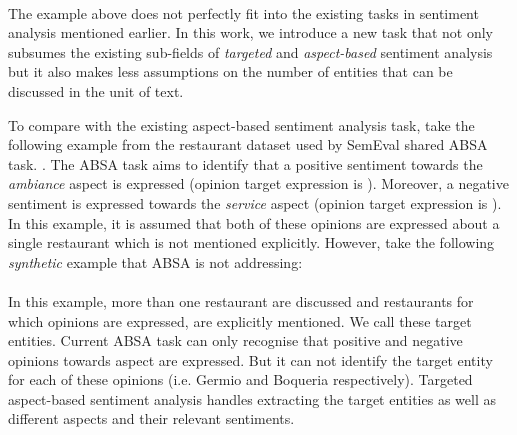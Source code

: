 \documentclass[11pt]{article}
\begin{document}
    \\
    
    The example above does not perfectly fit into the existing tasks in sentiment analysis mentioned earlier. In this work, we introduce a new task that not only subsumes the existing sub-fields of \emph{targeted} and \emph{aspect-based} sentiment analysis but it also makes less assumptions on the number of entities that can be discussed in the unit of text. 
    
    To compare with the existing aspect-based sentiment analysis task, take the following example from the restaurant dataset used by SemEval shared ABSA~\cite{SemEval_2016_task5} task. . The ABSA task aims to identify that a positive sentiment towards the \textit{ambiance} aspect is expressed (opinion target expression is ). Moreover, a negative sentiment is expressed towards the \textit{service} aspect (opinion target expression is ). In this example, it is assumed that both of these opinions are expressed about a single restaurant which is not mentioned explicitly. However, take the following \emph{synthetic} example that ABSA is not addressing: \\
    
     \\
    
    In this example, more than one restaurant are discussed and restaurants for which opinions are expressed, are explicitly mentioned. We call these target entities. Current ABSA task can only recognise that positive and negative opinions towards aspect  are expressed. But it can not identify the target entity for each of these opinions (i.e. Germio and Boqueria respectively). Targeted aspect-based sentiment analysis handles extracting the target entities as well as different aspects and their relevant sentiments.
    
\end{document}
